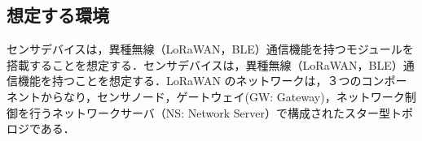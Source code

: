 \subsection{想定する環境}
センサデバイスは，異種無線（LoRaWAN，BLE）通信機能を持つモジュールを搭載することを想定する．センサデバイスは，異種無線（LoRaWAN，BLE）通信機能を持つことを想定する．LoRaWAN のネットワークは，３つのコンポーネントからなり，センサノード，ゲートウェイ(GW: Gateway)，ネットワーク制御を行うネットワークサーバ（NS: Network Server）で構成されたスター型トポロジである．